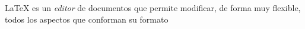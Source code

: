 \documentclass{article}
\begin{document}
\LaTeX{} es un \textit{editor} de documentos que permite modificar, 
de forma muy flexible, todos los aspectos que conforman su formato
\end{document}
